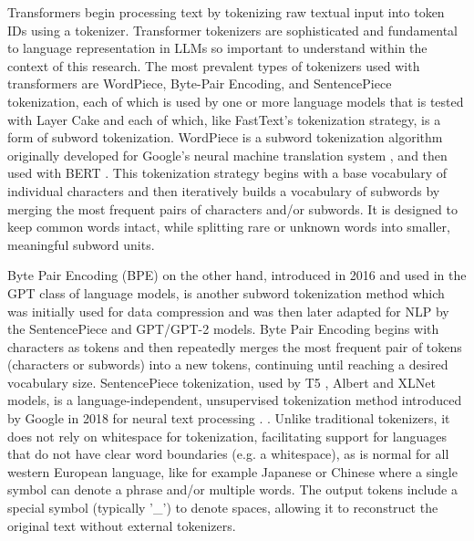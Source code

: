 \documentclass[final]{clv2025}
\begin{document}
Transformers begin processing text by tokenizing raw textual input into token IDs using a tokenizer. Transformer tokenizers are sophisticated and fundamental to language representation in LLMs so important to understand within the context of this research. The most prevalent types of tokenizers used with transformers are WordPiece, Byte-Pair Encoding, and SentencePiece tokenization, each of which is used by one or more language models that is tested with Layer Cake and each of which, like FastText's tokenization strategy, is a form of subword tokenization. WordPiece is a subword tokenization algorithm originally developed for Google's neural machine translation system \cite{schuster} \cite{wu}, and then used with BERT \cite{devlin-etal-2019-bert}. This tokenization strategy begins with a base vocabulary of individual characters and then iteratively builds a vocabulary of subwords by merging the most frequent pairs of characters and/or subwords. It is designed to keep common words intact, while splitting rare or unknown words into smaller, meaningful subword units. 

Byte Pair Encoding (BPE) on the other hand, introduced in 2016 \cite{sennrich-etal-2016-neural} and used in the GPT class of language models, is another subword tokenization method which was initially used for data compression and was then later adapted for NLP by the SentencePiece and GPT/GPT-2 models. Byte Pair Encoding begins with characters as tokens and then repeatedly merges the most frequent pair of tokens (characters or subwords) into a new tokens, continuing until reaching a desired vocabulary size. SentencePiece tokenization, used by T5 \cite{raffel2019exploring}, Albert \cite{lan2019albert} and XLNet \cite{yang2019xlnet} models, is a language-independent, unsupervised tokenization method introduced by Google in 2018 for neural text processing \cite{kudo2018sentencepiece}. . Unlike traditional tokenizers, it does not rely on whitespace for tokenization, facilitating support for languages that do not have clear word boundaries (e.g. a whitespace), as is normal for all western European language, like for example Japanese or Chinese where a single symbol can denote a phrase and/or multiple words. The output tokens include a special symbol (typically '\_') to denote spaces, allowing it to reconstruct the original text without external tokenizers.
\end{document}
